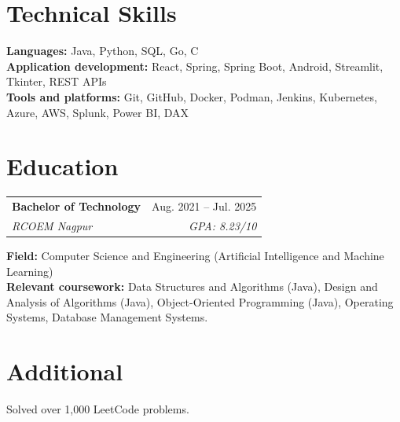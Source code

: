 \documentclass[a4paper,11pt]{article}
\begin{document}
\section{Technical Skills}
\small\textbf{Languages:} Java, Python, SQL, Go, C \\
\textbf{Application development:} React, Spring, Spring Boot, Android, Streamlit, Tkinter, REST APIs \\
\textbf{Tools and platforms:} Git, GitHub, Docker, Podman, Jenkins, Kubernetes, Azure, AWS, Splunk, Power BI, DAX

\section{Education}
\begin{tabularx}{\textwidth}{@{}Xr@{}}
  \textbf{Bachelor of Technology} & Aug. 2021 -- Jul. 2025 \\
  \textit{\small RCOEM Nagpur} & \textit{\small GPA: 8.23/10} \\
\end{tabularx}
\small\textbf{Field:} Computer Science and Engineering (Artif{}icial Intelligence and Machine Learning)\\
\small\textbf{Relevant coursework:} Data Structures and Algorithms (Java), Design and Analysis of Algorithms (Java), Object-Oriented Programming (Java), Operating Systems, Database Management Systems.

\section{Additional}
\small Solved over 1,000 LeetCode problems.
\end{document}
